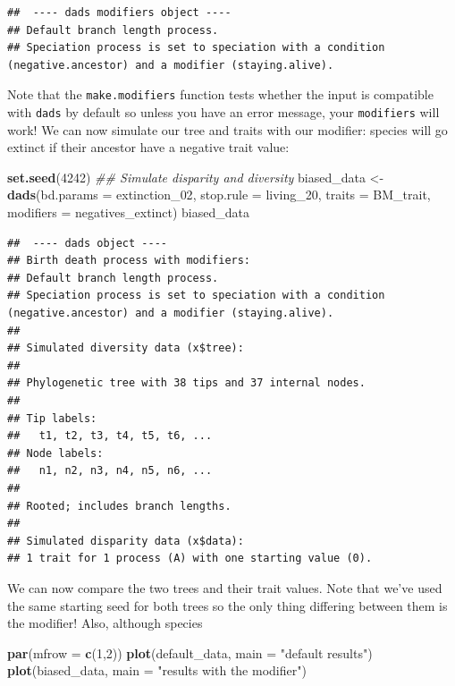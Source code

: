\documentclass[]{book}
\newenvironment{Shaded}{\begin{snugshade}}{\end{snugshade}}
\newcommand{\CommentTok}[1]{\textcolor[rgb]{0.56,0.35,0.01}{\textit{#1}}}
\newcommand{\DataTypeTok}[1]{\textcolor[rgb]{0.13,0.29,0.53}{#1}}
\newcommand{\DecValTok}[1]{\textcolor[rgb]{0.00,0.00,0.81}{#1}}
\newcommand{\KeywordTok}[1]{\textcolor[rgb]{0.13,0.29,0.53}{\textbf{#1}}}
\newcommand{\NormalTok}[1]{#1}
\newcommand{\StringTok}[1]{\textcolor[rgb]{0.31,0.60,0.02}{#1}}
\begin{document}
\begin{verbatim}
##  ---- dads modifiers object ---- 
## Default branch length process.
## Speciation process is set to speciation with a condition (negative.ancestor) and a modifier (staying.alive).
\end{verbatim}

Note that the \texttt{make.modifiers} function tests whether the input is compatible with \texttt{dads} by default so unless you have an error message, your \texttt{modifiers} will work!
We can now simulate our tree and traits with our modifier: species will go extinct if their ancestor have a negative trait value:

\begin{Shaded}
\begin{Highlighting}[]
\KeywordTok{set.seed}\NormalTok{(}\DecValTok{4242}\NormalTok{)}
\CommentTok{## Simulate disparity and diversity}
\NormalTok{biased_data <-}\StringTok{ }\KeywordTok{dads}\NormalTok{(}\DataTypeTok{bd.params =}\NormalTok{ extinction_}\DecValTok{02}\NormalTok{,}
                    \DataTypeTok{stop.rule =}\NormalTok{ living_}\DecValTok{20}\NormalTok{,}
                    \DataTypeTok{traits    =}\NormalTok{ BM_trait,}
                    \DataTypeTok{modifiers =}\NormalTok{ negatives_extinct)}
\NormalTok{biased_data}
\end{Highlighting}
\end{Shaded}

\begin{verbatim}
##  ---- dads object ---- 
## Birth death process with modifiers:
## Default branch length process.
## Speciation process is set to speciation with a condition (negative.ancestor) and a modifier (staying.alive).
## 
## Simulated diversity data (x$tree):
## 
## Phylogenetic tree with 38 tips and 37 internal nodes.
## 
## Tip labels:
##   t1, t2, t3, t4, t5, t6, ...
## Node labels:
##   n1, n2, n3, n4, n5, n6, ...
## 
## Rooted; includes branch lengths.
## 
## Simulated disparity data (x$data):
## 1 trait for 1 process (A) with one starting value (0).
\end{verbatim}

We can now compare the two trees and their trait values.
Note that we've used the same starting seed for both trees so the only thing differing between them is the modifier!
Also, although species

\begin{Shaded}
\begin{Highlighting}[]
\KeywordTok{par}\NormalTok{(}\DataTypeTok{mfrow =} \KeywordTok{c}\NormalTok{(}\DecValTok{1}\NormalTok{,}\DecValTok{2}\NormalTok{))}
\KeywordTok{plot}\NormalTok{(default_data, }\DataTypeTok{main =} \StringTok{"default results"}\NormalTok{)}
\KeywordTok{plot}\NormalTok{(biased_data, }\DataTypeTok{main =} \StringTok{"results with the modifier"}\NormalTok{)}
\end{Highlighting}
\end{Shaded}
\end{document}
